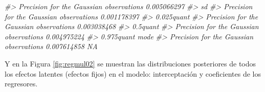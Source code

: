 \documentclass[
]{book}
\newenvironment{Shaded}{\begin{snugshade}}{\end{snugshade}}
\newcommand{\AttributeTok}[1]{\textcolor[rgb]{0.77,0.63,0.00}{#1}}
\newcommand{\CommentTok}[1]{\textcolor[rgb]{0.56,0.35,0.01}{\textit{#1}}}
\newcommand{\ControlFlowTok}[1]{\textcolor[rgb]{0.13,0.29,0.53}{\textbf{#1}}}
\newcommand{\DecValTok}[1]{\textcolor[rgb]{0.00,0.00,0.81}{#1}}
\newcommand{\FloatTok}[1]{\textcolor[rgb]{0.00,0.00,0.81}{#1}}
\newcommand{\FunctionTok}[1]{\textcolor[rgb]{0.00,0.00,0.00}{#1}}
\newcommand{\NormalTok}[1]{#1}
\newcommand{\OtherTok}[1]{\textcolor[rgb]{0.56,0.35,0.01}{#1}}
\newcommand{\SpecialCharTok}[1]{\textcolor[rgb]{0.00,0.00,0.00}{#1}}
\newcommand{\StringTok}[1]{\textcolor[rgb]{0.31,0.60,0.02}{#1}}
\begin{document}
\begin{Shaded}
\begin{Highlighting}[]
\CommentTok{\#\textgreater{} Precision for the Gaussian observations 0.005066297}
\CommentTok{\#\textgreater{}                                                  sd}
\CommentTok{\#\textgreater{} Precision for the Gaussian observations 0.001178397}
\CommentTok{\#\textgreater{}                                          0.025quant}
\CommentTok{\#\textgreater{} Precision for the Gaussian observations 0.003038468}
\CommentTok{\#\textgreater{}                                            0.5quant}
\CommentTok{\#\textgreater{} Precision for the Gaussian observations 0.004975224}
\CommentTok{\#\textgreater{}                                          0.975quant mode}
\CommentTok{\#\textgreater{} Precision for the Gaussian observations 0.007614858   NA}
\end{Highlighting}
\end{Shaded}

Y en la Figura \ref{fig:regmul02} se muestran las distribuciones posteriores de todos los efectos latentes (efectos fijos) en el modelo: interceptación y coeficientes de los regresores.

\begin{Shaded}
\end{Shaded}
\end{document}
